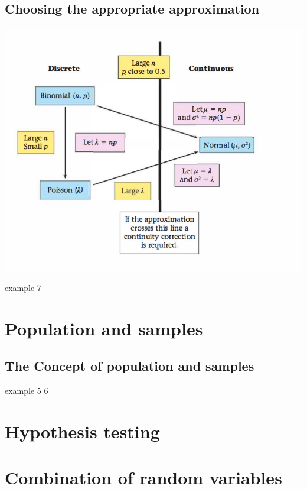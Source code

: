 \documentclass[a4paper]{article}
\begin{document}
\subsection{Choosing the appropriate approximation}
\begin{center}
	\includegraphics[scale=0.5]{img_S/13_3_intro}
\end{center}
\begin{eg}
    example 7
\end{eg}

\section{Population and samples}

\subsection{The Concept of population and samples}
\begin{eg}
    example 5 6
\end{eg}

\section{Hypothesis testing}

\section{Combination of random variables}
\end{document}
